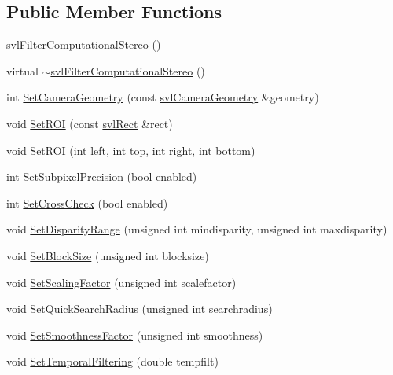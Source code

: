 \subsection*{Public Member Functions}
\begin{DoxyCompactItemize}
\item 
\hyperlink{classsvl_filter_computational_stereo_a081922641ecef34bd94e02ce4e2936e1}{svl\-Filter\-Computational\-Stereo} ()
\item 
virtual \hyperlink{classsvl_filter_computational_stereo_a6a64a4a64ad148a72f1db89b55510089}{$\sim$svl\-Filter\-Computational\-Stereo} ()
\item 
int \hyperlink{classsvl_filter_computational_stereo_afc1156eba6d31b60e38b4125e7b9a116}{Set\-Camera\-Geometry} (const \hyperlink{classsvl_camera_geometry}{svl\-Camera\-Geometry} \&geometry)
\item 
void \hyperlink{classsvl_filter_computational_stereo_aaffffd3927a1d6a50253a9919f58e7be}{Set\-R\-O\-I} (const \hyperlink{structsvl_rect}{svl\-Rect} \&rect)
\item 
void \hyperlink{classsvl_filter_computational_stereo_a6475ff98b13cf889467380bd8a613da6}{Set\-R\-O\-I} (int left, int top, int right, int bottom)
\item 
int \hyperlink{classsvl_filter_computational_stereo_a8e41efd4a553cbbd69256bfef402ae53}{Set\-Subpixel\-Precision} (bool enabled)
\item 
int \hyperlink{classsvl_filter_computational_stereo_a36417f28b59f8c1753a507f5102f6814}{Set\-Cross\-Check} (bool enabled)
\item 
void \hyperlink{classsvl_filter_computational_stereo_a6c708289f92f896fe429db40423b5a87}{Set\-Disparity\-Range} (unsigned int mindisparity, unsigned int maxdisparity)
\item 
void \hyperlink{classsvl_filter_computational_stereo_a45e16a24dba1b25f02199c75897505fc}{Set\-Block\-Size} (unsigned int blocksize)
\item 
void \hyperlink{classsvl_filter_computational_stereo_ac29d5539360f6bdf10976cc5f9a9b067}{Set\-Scaling\-Factor} (unsigned int scalefactor)
\item 
void \hyperlink{classsvl_filter_computational_stereo_adb3e40958080caa04692457663945f03}{Set\-Quick\-Search\-Radius} (unsigned int searchradius)
\item 
void \hyperlink{classsvl_filter_computational_stereo_af11aff403ea39efb9d80dfa543b1bc16}{Set\-Smoothness\-Factor} (unsigned int smoothness)
\item 
void \hyperlink{classsvl_filter_computational_stereo_a52aa5340109acaf4a3148a5144589bdb}{Set\-Temporal\-Filtering} (double tempfilt)

\end{DoxyCompactItemize}
